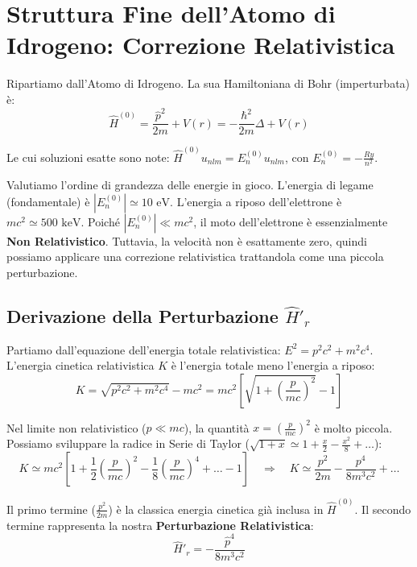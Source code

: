 \documentclass[11pt, a4paper]{article}
\begin{document}
\section{Struttura Fine dell'Atomo di Idrogeno: Correzione Relativistica} %

Ripartiamo dall'Atomo di Idrogeno. La sua Hamiltoniana di Bohr (imperturbata) è: %
\begin{equation}
    \hat{H}^{(0)} = \frac{\hat{p}^2}{2m} + V(r) = -\frac{\hbar^2}{2m}\Delta + V(r) %
\end{equation}

\noindent
Le cui soluzioni esatte sono note: $\hat{H}^{(0)} u_{nlm} = E_n^{(0)} u_{nlm}$, con $E_n^{(0)} = -\frac{Ry}{n^2}$. %

\noindent
Valutiamo l'ordine di grandezza delle energie in gioco. L'energia di legame (fondamentale) è $|E_n^{(0)}| \simeq 10 \text{ eV}$. L'energia a riposo dell'elettrone è $mc^2 \simeq 500 \text{ keV}$. %
Poiché $|E_n^{(0)}| \ll mc^2$, il moto dell'elettrone è essenzialmente \textbf{Non Relativistico}. Tuttavia, la velocità non è esattamente zero, quindi possiamo applicare una correzione relativistica trattandola come una piccola perturbazione. %

\subsection{Derivazione della Perturbazione $\hat{H}'_r$} %

Partiamo dall'equazione dell'energia totale relativistica: $E^2 = p^2c^2 + m^2c^4$. L'energia cinetica relativistica $K$ è l'energia totale meno l'energia a riposo: %
\begin{equation*}
    K = \sqrt{p^2c^2 + m^2c^4} - mc^2 = mc^2 \left[ \sqrt{1 + \left(\frac{p}{mc}\right)^2} - 1 \right] %
\end{equation*}

\noindent
Nel limite non relativistico ($p \ll mc$), la quantità $x = \left(\frac{p}{mc}\right)^2$ è molto piccola. Possiamo sviluppare la radice in Serie di Taylor ($\sqrt{1+x} \simeq 1 + \frac{x}{2} - \frac{x^2}{8} + \dots$): %
\begin{equation*}
    K \simeq mc^2 \left[ 1 + \frac{1}{2}\left(\frac{p}{mc}\right)^2 - \frac{1}{8}\left(\frac{p}{mc}\right)^4 + \dots - 1 \right] \quad \Rightarrow \quad K \simeq \frac{p^2}{2m} - \frac{p^4}{8m^3c^2} + \dots %
\end{equation*}

\noindent
Il primo termine ($\frac{p^2}{2m}$) è la classica energia cinetica già inclusa in $\hat{H}^{(0)}$. Il secondo termine rappresenta la nostra \textbf{Perturbazione Relativistica}: %
\begin{equation}
    \boxed{ \hat{H}'_r = -\frac{\hat{p}^4}{8m^3c^2} } %
\end{equation}
\end{document}
